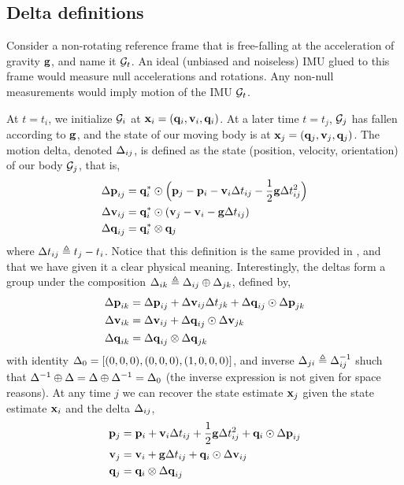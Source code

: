 \subsection{Delta definitions}

Consider a non-rotating reference frame that is free-falling at the acceleration of gravity ${\bf g}$, and name it $\mathcal{G}_t$. 
An ideal (unbiased and noiseless) IMU glued to this frame would measure null accelerations and rotations. 
Any non-null measurements would imply motion of the IMU \wrt  $\mathcal{G}_t$.

At $t=t_i$, we initialize $\mathcal{G}_i$ at ${\bf x}_i=({\bf q}_i,{\bf v}_i,{\bf q}_i)$.
At a later time $t=t_j$,  $\mathcal{G}_j$ has fallen according to ${\bf g}$, and the state of our moving body is at ${\bf x}_j=({\bf q}_j,{\bf v}_j,{\bf q}_j)$.
The motion delta, denoted $\D_{ij}%
$, is defined as the state (position, velocity, orientation) of our body \wrt  $\mathcal{G}_j$, that is,
%
\begin{align}\label{equ:delta_definition}
\begin{split}
{\Delta{\bf p}}_{ij} &= {\bf q}_i^*\odot\Big({\bf p}_j - {\bf p}_i - {\bf v}_i\Delta t_{ij} - \frac12{\bf g}\Delta t_{ij}^2\Big) \\
{\Delta{\bf v}}_{ij} &= {\bf q}_i^*\odot({\bf v}_j - {\bf v}_i - {\bf g}\Delta t_{ij}) \\
{\Delta{\bf q}}_{ij} &= {\bf q}_i^*\otimes{\bf q}_j 
\end{split}
\end{align}
%
where $\Delta t_{ij} \triangleq t_j - t_i$. 
Notice that this definition is the same provided in \cite{LUPTON-09,FORSTER-16-techrep}, and that we have given it a clear physical meaning.
Interestingly, the deltas form a group under the composition $\Delta_{ik}\triangleq\Delta_{ij}\oplus\Delta_{jk}$, defined by,
%
\begin{align} \label{equ:composition}
\begin{split}
{\Delta{\bf p}}_{ik} 
&= {\Delta{\bf p}}_{ij} + {\Delta{\bf v}}_{ij}\Delta t_{jk} + {\Delta{\bf q}}_{ij}\odot{\Delta{\bf p}}_{jk} \\
{\Delta{\bf v}}_{ik} 
&= {\Delta{\bf v}}_{ij} + {\Delta{\bf q}}_{ij}\odot{\Delta{\bf v}}_{jk} \\
{\Delta{\bf q}}_{ik} 
&= {\Delta{\bf q}}_{ij}\otimes{\Delta{\bf q}}_{jk} 
\end{split}
\end{align}
%
with identity $\Delta_0=[(0,0,0),(0,0,0),(1,0,0,0)]$, and inverse $\Delta_{ji}\triangleq\Delta_{ij}^{-1}$ shuch that $\Delta^{-1}\oplus\Delta=\Delta\oplus\Delta^{-1}=\Delta_0$ (the inverse expression is not given for space reasons).
At any time $j$ we can recover the state estimate ${\bf x}_j$ given the state estimate ${\bf x}_i$ and the delta $\Delta_{ij}$,
%
\begin{align} \label{equ:reconstruction}
\begin{split}
{\bf p}_j &= {\bf p}_i + {\bf v}_i\Delta t_{ij} + \frac12{\bf g}\Delta t_{ij}^2 + {\bf q}_i\odot{\Delta{\bf p}}_{ij} \\
{\bf v}_j &= {\bf v}_i + {\bf g}\Delta t_{ij} + {\bf q}_i\odot{\Delta{\bf v}}_{ij} \\
{\bf q}_j &= {\bf q}_i\otimes{\Delta{\bf q}}_{ij}   
\end{split}
\end{align}

